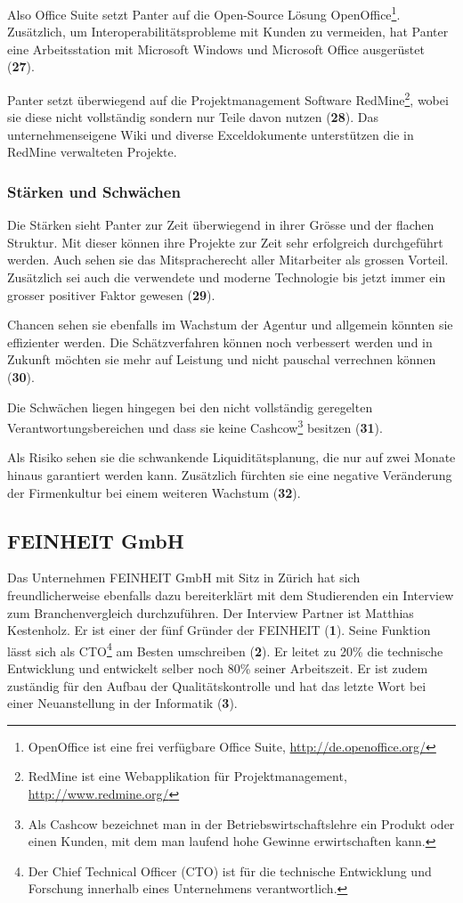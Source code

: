 Also Office Suite setzt Panter auf die Open-Source
Lösung OpenOffice\footnote{OpenOffice ist eine frei verfügbare Office Suite, 
\url{http://de.openoffice.org/}}. Zusätzlich, um Interoperabilitätsprobleme
mit Kunden zu vermeiden, hat Panter eine Arbeitsstation mit Microsoft Windows
und Microsoft Office ausgerüstet (\textbf{27}).

Panter setzt überwiegend auf die Projektmanagement Software RedMine\footnote{RedMine
ist eine Webapplikation für Projektmanagement, \url{http://www.redmine.org/}},
wobei sie diese nicht vollständig sondern nur Teile davon nutzen (\textbf{28}). 
Das unternehmenseigene Wiki und diverse Exceldokumente unterstützen die in RedMine
verwalteten Projekte. 

\subsubsection{Stärken und Schwächen}
Die Stärken sieht Panter zur Zeit überwiegend in ihrer Grösse und der flachen
Struktur. Mit dieser können ihre Projekte zur Zeit sehr erfolgreich durchgeführt 
werden. Auch sehen sie das Mitspracherecht aller Mitarbeiter als grossen Vorteil.
Zusätzlich sei auch die verwendete und moderne Technologie bis jetzt immer
ein grosser positiver Faktor gewesen (\textbf{29}).

Chancen sehen sie ebenfalls im Wachstum der Agentur und allgemein könnten
sie effizienter werden. Die Schätzverfahren können noch verbessert werden und
in Zukunft möchten sie mehr auf Leistung und nicht pauschal verrechnen können (\textbf{30}).

Die Schwächen liegen hingegen bei den nicht vollständig geregelten 
Verantwortungsbereichen und dass sie keine Cashcow\footnote{Als Cashcow bezeichnet
man in der Betriebswirtschaftslehre ein Produkt oder einen Kunden, mit dem man
laufend hohe Gewinne erwirtschaften kann.} besitzen (\textbf{31}).

Als Risiko sehen sie die schwankende Liquiditätsplanung, die nur auf zwei Monate 
hinaus garantiert werden kann. Zusätzlich fürchten sie eine negative Veränderung 
der Firmenkultur bei einem weiteren Wachstum (\textbf{32}).

\subsection{FEINHEIT GmbH}
Das Unternehmen FEINHEIT GmbH mit Sitz in Zürich hat sich freundlicherweise
ebenfalls dazu bereiterklärt mit dem Studierenden ein Interview zum Branchenvergleich
durchzuführen. Der Interview Partner ist Matthias Kestenholz. Er ist einer der
fünf Gründer der FEINHEIT (\textbf{1}). Seine Funktion lässt sich als CTO\footnote{Der Chief Technical Officer (CTO) ist
für die technische Entwicklung und Forschung innerhalb eines Unternehmens
verantwortlich.} am Besten umschreiben (\textbf{2}). Er leitet zu 20\% die
technische Entwicklung und entwickelt selber noch 80\% seiner Arbeitszeit. Er
ist zudem zuständig für den Aufbau der Qualitätskontrolle und hat das letzte
Wort bei einer Neuanstellung in der Informatik (\textbf{3}).

